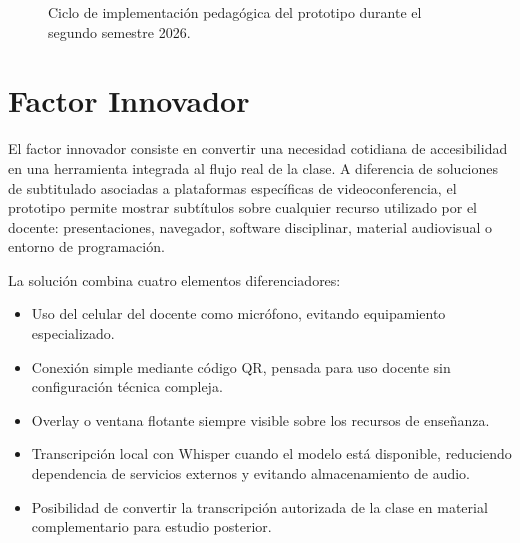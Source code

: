 \documentclass[11pt,letterpaper]{article}
\begin{document}
\begin{figure}[H]
\centering
{}
\caption{Ciclo de implementación pedagógica del prototipo durante el segundo semestre 2026.}
\end{figure}

\section{Factor Innovador}

El factor innovador consiste en convertir una necesidad cotidiana de accesibilidad en una herramienta integrada al flujo real de la clase. A diferencia de soluciones de subtitulado asociadas a plataformas específicas de videoconferencia, el prototipo permite mostrar subtítulos sobre cualquier recurso utilizado por el docente: presentaciones, navegador, software disciplinar, material audiovisual o entorno de programación.

La solución combina cuatro elementos diferenciadores:

\begin{itemize}
  \item Uso del celular del docente como micrófono, evitando equipamiento especializado.
  \item Conexión simple mediante código QR, pensada para uso docente sin configuración técnica compleja.
  \item Overlay o ventana flotante siempre visible sobre los recursos de enseñanza.
  \item Transcripción local con Whisper cuando el modelo está disponible, reduciendo dependencia de servicios externos y evitando almacenamiento de audio.
  \item Posibilidad de convertir la transcripción autorizada de la clase en material complementario para estudio posterior.
\end{itemize}
\end{document}
